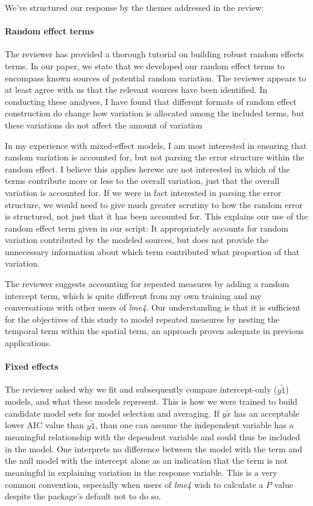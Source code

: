 \documentclass[parskip=half]{scrartcl}
\begin{document}
We've structured our response by the themes addressed in the review:

\paragraph{Random effect terms} 
The reviewer has provided a thorough tutorial on building robust random effects terms. 
In our paper, we state that we developed our random effect terms to encompass known sources of potential random variation. 
The reviewer appears to at least agree with us that the relevant sources have been identified. 
In conducting these analyses, I have found that different formats of random effect construction do change how variation is allocated among the included terms, but these variations do not affect the amount of variation 

In my experience with mixed-effect models, I am most interested in ensuring that random variation is accounted for, but not parsing the error structure within the random effect. 
I believe this applies here\textemdash we are not interested in which of the terms contribute more or less to the overall variation, just that the overall variation is accounted for. 
If we were in fact interested in parsing the error structure, we would need to give much greater scrutiny to how the random error is structured, not just that it has been accounted for.
This explains our use of the random effect term given in our script: It appropriately accounts for random variation contributed by the modeled sources, but does not provide the unnecessary information about which term contributed what proportion of that variation. 

The reviewer suggests accounting for repeated measures by adding a random intercept term, which is quite different from my own training and my conversations with other users of \emph{lme4}. 
Our understanding is that it is sufficient for the objectives of this study to model repeated measures by nesting the temporal term within the spatial term, an approach proven adequate in previous applications. 

\paragraph{Fixed effects} 
The reviewer asked why we fit and subsequently compare intercept-only ($y \tilde 1$) models, and what these models represent. 
This is how we were trained to build candidate model sets for model selection and averaging. 
If $y \tilde x$ has an acceptable lower AIC value than $y \tilde 1$, than one can assume the independent variable has a meaningful relationship with the dependent variable and sould thus be included in the model. 
One interprets no difference between the model with the term and the null model with the intercept alone as an indication that the term is not meaningful in explaining variation in the response variable. 
This is a very common convention, especially when users of \emph{lme4} wish to calculate a $P$ value despite the package's default not to do so.
\end{document}
